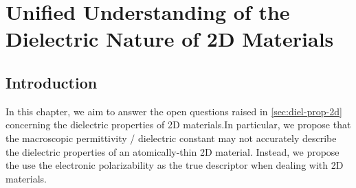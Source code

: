\chapter{Unified Understanding of the Dielectric Nature of 2D Materials}
\label{ch:diel}
\renewcommand*\imgdir{img/diel/}


\vspace{1em}


\section{Introduction}
\label{sec:diel-introduction}

In this chapter, we aim to answer the open questions raised in
\autoref{sec:diel-prop-2d} concerning the dielectric properties of 2D
materials.In particular, we propose that the macroscopic permittivity
/ dielectric constant may not accurately describe the dielectric
properties of an atomically-thin 2D material. Instead, we propose the
use the electronic polarizability as the true descriptor when dealing
with 2D materials.


